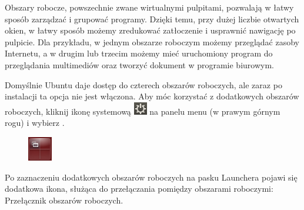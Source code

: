 Obszary robocze, powszechnie zwane wirtualnymi pulpitami, pozwalają w łatwy sposób zarządzać i grupować programy. Dzięki temu, przy dużej liczbie otwartych okien, w łatwy sposób możemy zredukować zatłoczenie i usprawnić nawigację po pulpicie. Dla przykładu, w jednym obszarze roboczym możemy przeglądać zasoby Internetu, a w drugim lub trzecim możemy mieć uruchomiony program do przeglądania multimediów oraz tworzyć dokument w programie biurowym.

Domyślnie Ubuntu daje dostęp do czterech obszarów roboczych, ale zaraz po instalacji ta opcja nie jest włączona. Aby móc korzystać z dodatkowych obszarów roboczych, kliknij ikonę systemową \includegraphics{images/ikony_zasilanie.png} na panelu menu (w prawym górnym rogu) i wybierz .

\begin{figure}
	\vspace{-10pt}
	\includegraphics[width=\linewidth]{images/ikony_obszary_robocze.png}
\end{figure}

Po zaznaczeniu dodatkowych obszarów roboczych na pasku Launchera pojawi się dodatkowa ikona, służąca do przełączania pomiędzy obszarami roboczymi: \textcolor{ubuntu_orange}{Przełącznik obszarów roboczych}.

